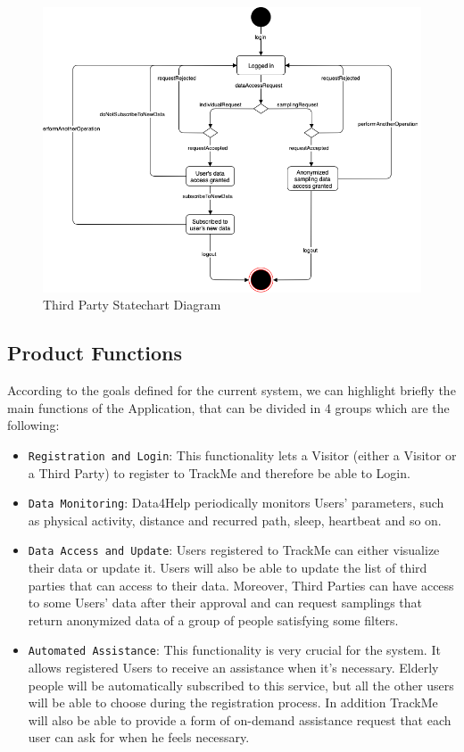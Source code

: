 \documentclass[12pt,a4paper]{article}
\begin{document}
			\begin{figure}[H]
				\centering
				\includegraphics[width=1.0\linewidth]{Images/statechart_third_party}
				\caption{Third Party Statechart Diagram}
				\label{fig:statechart_third_party}
			\end{figure}

		\newpage
		\subsection{Product Functions}
			According to the goals defined for the current system, we can highlight briefly the main functions of the Application, that can be divided in 4 groups which are the following:
			\begin{itemize}
				\item \texttt{Registration and Login}: This functionality lets a Visitor (either a Visitor or a Third Party) to register to TrackMe and therefore be able to Login.
				\item \texttt{Data Monitoring}: Data4Help periodically monitors Users' parameters, such as physical activity, distance and recurred path, sleep, heartbeat and so on.
				\item \texttt{Data Access and Update}: Users registered to TrackMe can either visualize their data or update it. Users will also be able to update the list of third parties that can access to their data.
				Moreover, Third Parties can have access to some Users' data after their approval and can request samplings that return anonymized data of a group of people satisfying some filters.
				\item \texttt{Automated Assistance}: This functionality is very crucial for the system. It allows registered Users to receive an assistance when it's necessary. Elderly people will be automatically subscribed to this service, but all the other users will be able to choose during the registration process. In addition TrackMe will also be able to provide a form of on-demand assistance request that each user can ask for when he feels necessary.
			\end{itemize}
	
\end{document}
